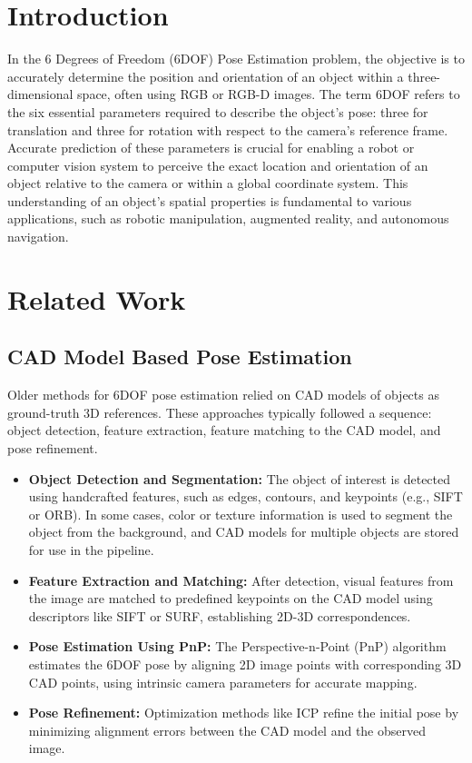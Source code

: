 \documentclass[conference]{IEEEtran}
\begin{document}
\section{Introduction}
In the 6 Degrees of Freedom (6DOF) Pose Estimation problem, the objective is to accurately determine the position and orientation of an object within a three-dimensional space, often using RGB or RGB-D images. The term 6DOF refers to the six essential parameters required to describe the object’s pose: three for translation and three for rotation with respect to the camera's reference frame. Accurate prediction of these parameters is crucial for enabling a robot or computer vision system to perceive the exact location and orientation of an object relative to the camera or within a global coordinate system. This understanding of an object’s spatial properties is fundamental to various applications, such as robotic manipulation, augmented reality, and autonomous navigation.

\section{Related Work}

\subsection{CAD Model Based Pose Estimation}
Older methods for 6DOF pose estimation relied on CAD models of objects as ground-truth 3D references. These approaches typically followed a sequence: object detection, feature extraction, feature matching to the CAD model, and pose refinement.
\begin{itemize}
    \item \textbf{Object Detection and Segmentation:} The object of interest is detected using handcrafted features, such as edges, contours, and keypoints (e.g., SIFT or ORB). In some cases, color or texture information is used to segment the object from the background, and CAD models for multiple objects are stored for use in the pipeline.
    \item \textbf{Feature Extraction and Matching:} After detection, visual features from the image are matched to predefined keypoints on the CAD model using descriptors like SIFT or SURF, establishing 2D-3D correspondences.
    \item \textbf{Pose Estimation Using PnP:} The Perspective-n-Point (PnP) algorithm estimates the 6DOF pose by aligning 2D image points with corresponding 3D CAD points, using intrinsic camera parameters for accurate mapping.
    \item \textbf{Pose Refinement:} Optimization methods like ICP refine the initial pose by minimizing alignment errors between the CAD model and the observed image.
\end{itemize}
\end{document}
